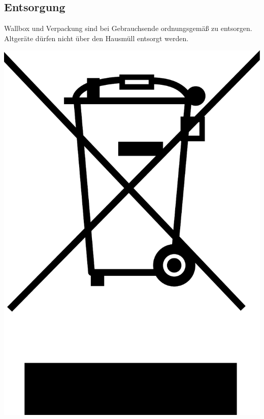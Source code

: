 \documentclass[a4paper,10pt]{article}
\begin{document}
\begin{multicols*}{2}
    \section{Entsorgung}
    \begin{minipage}{0.43\textwidth}
        Wallbox und Verpackung sind bei Gebrauchsende ordnungsgemäß zu
        entsorgen. Altgeräte dürfen nicht über den Hausmüll entsorgt werden.
    \end{minipage}\hfill
    \begin{minipage}{0.045\textwidth}
        \includegraphics[width=\linewidth]{./img_warp3/resized/weee.pdf}
    \end{minipage}



\end{multicols*}
\end{document}
